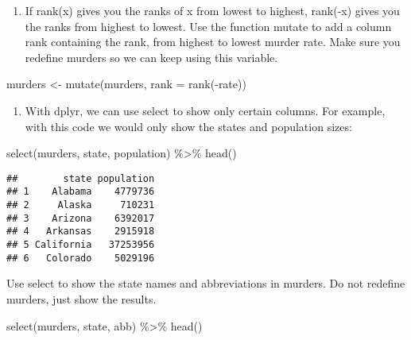 \documentclass[
]{article}
\newenvironment{Shaded}{\begin{snugshade}}{\end{snugshade}}
\newcommand{\AttributeTok}[1]{\textcolor[rgb]{0.77,0.63,0.00}{#1}}
\newcommand{\FunctionTok}[1]{\textcolor[rgb]{0.00,0.00,0.00}{#1}}
\newcommand{\NormalTok}[1]{#1}
\newcommand{\OtherTok}[1]{\textcolor[rgb]{0.56,0.35,0.01}{#1}}
\newcommand{\SpecialCharTok}[1]{\textcolor[rgb]{0.00,0.00,0.00}{#1}}
\providecommand{\tightlist}{%
  \setlength{\itemsep}{0pt}\setlength{\parskip}{0pt}}
\begin{document}
\begin{enumerate}
\def\labelenumi{\arabic{enumi}.}
\setcounter{enumi}{1}
\tightlist
\item
  If rank(x) gives you the ranks of x from lowest to highest, rank(-x)
  gives you the ranks from highest to lowest. Use the function mutate to
  add a column rank containing the rank, from highest to lowest murder
  rate. Make sure you redefine murders so we can keep using this
  variable.
\end{enumerate}

\begin{Shaded}
\begin{Highlighting}[]
\NormalTok{murders }\OtherTok{\textless{}{-}} \FunctionTok{mutate}\NormalTok{(murders, }\AttributeTok{rank =} \FunctionTok{rank}\NormalTok{(}\SpecialCharTok{{-}}\NormalTok{rate))}
\end{Highlighting}
\end{Shaded}

\begin{enumerate}
\def\labelenumi{\arabic{enumi}.}
\setcounter{enumi}{2}
\tightlist
\item
  With dplyr, we can use select to show only certain columns. For
  example, with this code we would only show the states and population
  sizes:
\end{enumerate}

\begin{Shaded}
\begin{Highlighting}[]
\FunctionTok{select}\NormalTok{(murders, state, population)  }\SpecialCharTok{\%\textgreater{}\%} \FunctionTok{head}\NormalTok{()}
\end{Highlighting}
\end{Shaded}

\begin{verbatim}
##        state population
## 1    Alabama    4779736
## 2     Alaska     710231
## 3    Arizona    6392017
## 4   Arkansas    2915918
## 5 California   37253956
## 6   Colorado    5029196
\end{verbatim}

Use select to show the state names and abbreviations in murders. Do not
redefine murders, just show the results.

\begin{Shaded}
\begin{Highlighting}[]
\FunctionTok{select}\NormalTok{(murders, state, abb) }\SpecialCharTok{\%\textgreater{}\%} \FunctionTok{head}\NormalTok{()}
\end{Highlighting}
\end{Shaded}
\end{document}
